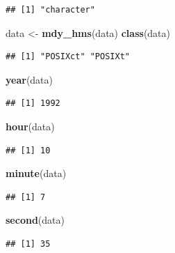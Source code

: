 \documentclass[
]{book}
\newenvironment{Shaded}{\begin{snugshade}}{\end{snugshade}}
\newcommand{\FunctionTok}[1]{\textcolor[rgb]{0.13,0.29,0.53}{\textbf{#1}}}
\newcommand{\NormalTok}[1]{#1}
\newcommand{\OtherTok}[1]{\textcolor[rgb]{0.56,0.35,0.01}{#1}}
\begin{document}
\begin{verbatim}
## [1] "character"
\end{verbatim}

\begin{Shaded}
\begin{Highlighting}[]
\NormalTok{data }\OtherTok{\textless{}{-}} \FunctionTok{mdy\_hms}\NormalTok{(data)}
\FunctionTok{class}\NormalTok{(data)}
\end{Highlighting}
\end{Shaded}

\begin{verbatim}
## [1] "POSIXct" "POSIXt"
\end{verbatim}

\begin{Shaded}
\begin{Highlighting}[]
\FunctionTok{year}\NormalTok{(data)}
\end{Highlighting}
\end{Shaded}

\begin{verbatim}
## [1] 1992
\end{verbatim}

\begin{Shaded}
\begin{Highlighting}[]
\FunctionTok{hour}\NormalTok{(data)}
\end{Highlighting}
\end{Shaded}

\begin{verbatim}
## [1] 10
\end{verbatim}

\begin{Shaded}
\begin{Highlighting}[]
\FunctionTok{minute}\NormalTok{(data)}
\end{Highlighting}
\end{Shaded}

\begin{verbatim}
## [1] 7
\end{verbatim}

\begin{Shaded}
\begin{Highlighting}[]
\FunctionTok{second}\NormalTok{(data)}
\end{Highlighting}
\end{Shaded}

\begin{verbatim}
## [1] 35
\end{verbatim}
\end{document}
